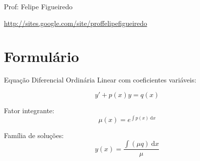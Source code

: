 \documentclass[a4paper]{article}
\newcommand{\ud}{\mathrm{\ d}}
\begin{document}
\parbox[c]{.825\textwidth}{\raggedright%
{Prof: Felipe Figueiredo\par}
{\url{http://sites.google.com/site/proffelipefigueiredo}}

\vspace{1cm}
}


\section{Formulário}

Equação Diferencial Ordinária Linear com coeficientes variáveis:

\begin{displaymath}
  y' + p(x)y = q(x)
\end{displaymath}

Fator integrante:
\begin{displaymath}
  \mu (x) = e^{\int p(x)\ud x}
\end{displaymath}

Família de soluções:
\begin{displaymath}
  y(x) = \frac{\int (\mu q) \ud x}{\mu}
\end{displaymath}
\end{document}
